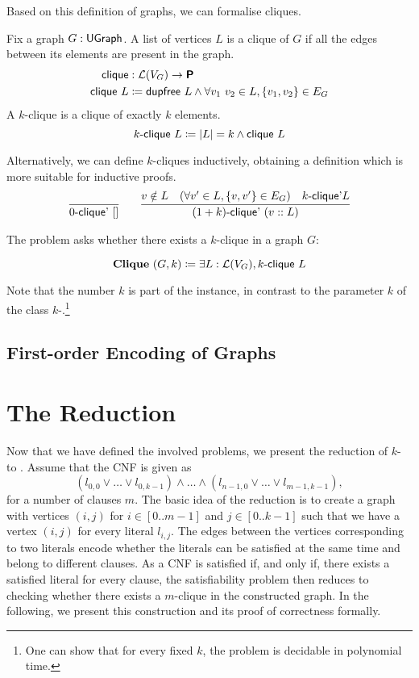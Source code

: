 \newcommand{\clique}{\textsf{clique}}
\newcommand{\kclique}[1]{\text{$#1$-\clique}} 
\newcommand{\kcliqueind}[1]{\text{$#1$-\textsf{clique}'}}
Based on this definition of graphs, we can formalise cliques. 
\begin{definition}
  Fix a graph $G : \textsf{UGraph}$. A list of vertices $L$ is a clique of $G$ if all the edges between its elements are present in the graph.
  \begin{align*}
    \clique{} &: \listsof{V_G} \rightarrow \Prop \\
    \clique{}~L &\defeq \dupfree~L \land \forall v_1~v_2 \in L, \{v_1, v_2\} \in E_G 
  \end{align*}
  A $k$-clique is a clique of exactly $k$ elements. 
  \[\kclique{k}~L \defeq \length{L} = k \land \clique{}~L \]
\end{definition}

Alternatively, we can define $k$-cliques inductively, obtaining a definition which is more suitable for inductive proofs. 
\begin{align*}
  \infer{\kcliqueind{0}~\nil}{} \qquad \infer{\kcliqueind{(\natS{k})}~(v :: L)}{v \notin L \quad (\forall v' \in L, \{v, v'\} \in E_G) \quad \kcliqueind{k}{L}}
\end{align*}

The \Clique{} problem asks whether there exists a $k$-clique in a graph $G$: 
\begin{definition}[\Clique{}]
  \[\Clique{}~(G, k) \defeq \exists L : \listsof{V_G}, \kclique{k}~L \]
\end{definition}
Note that the number $k$ is part of the instance, in contrast to the parameter $k$ of the class $k$-\SAT{}.\footnote{One can show that for every fixed $k$, the \Clique{} problem is decidable in polynomial time.}


\newcommand{\FlatClique}{\textsf{FlatClique}}
\subsection{First-order Encoding of Graphs}

\section{The Reduction}
Now that we have defined the involved problems, we present the reduction of $k$-\SAT{} to \Clique{}. 
Assume that the CNF is given as 
\[(l_{0, 0} \lor \ldots \lor l_{0, k-1}) \land \ldots \land (l_{n-1, 0} \lor \ldots \lor l_{m-1, k-1}), \]
for a number of clauses $m$.
The basic idea of the reduction is to create a graph with vertices $(i, j)$ for $i \in [0..m-1]$ and $j \in [0..k-1]$ such that we have a vertex $(i, j)$ for every literal $l_{i, j}$. The edges between the vertices corresponding to two literals encode whether the literals can be satisfied at the same time and belong to different clauses. As a CNF is satisfied if, and only if, there exists a satisfied literal for every clause, the satisfiability problem then reduces to checking whether there exists a $m$-clique in the constructed graph. 
In the following, we present this construction and its proof of correctness formally.

